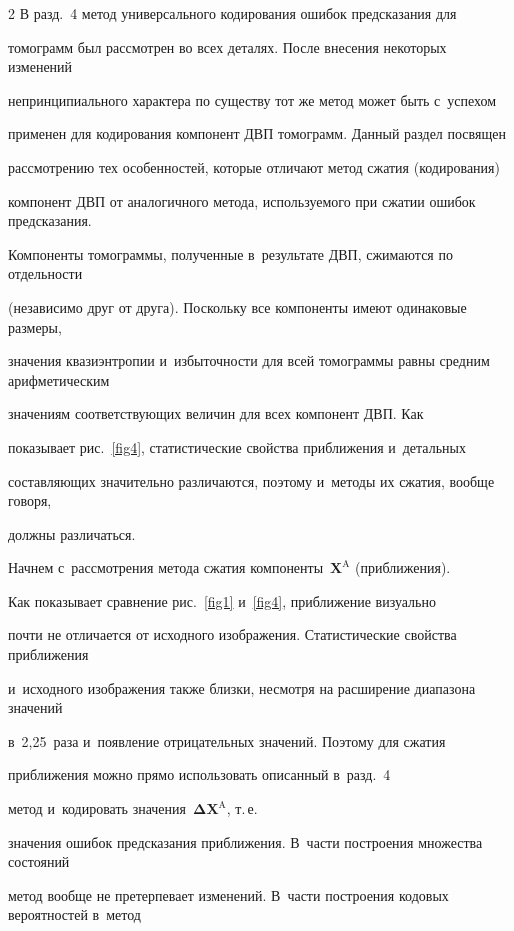 \begin{multicols}{2}
В разд.~4 метод универсального кодирования ошибок предсказания для 

томограмм был рас\-смот\-рен во всех деталях. После внесения некоторых изменений 

непринципиального характера по существу тот же метод может быть с~успехом 

применен для кодирования компонент ДВП томограмм. Данный раздел посвящен 

рассмотрению тех особенностей, которые отличают метод сжатия (кодирования) 

компонент ДВП от аналогичного метода, используемого при сжатии ошибок предсказания.



Компоненты томограммы, полученные в~результате ДВП, сжимаются по отдельности 

(независимо друг от друга). Поскольку все компоненты имеют одинаковые размеры, 

значения квазиэнтропии и~избыточности для всей томограммы равны средним арифметическим 

значениям соответствующих величин для всех компонент ДВП. Как 

показывает рис.~\ref{fig4}, статистические свойства приближения и~детальных 

составляющих значительно различаются, поэтому и~методы их сжатия, вообще говоря, 

должны различаться.



Начнем с~рассмотрения метода сжатия компоненты~$\mathbf{X}^{\mathrm{A}}$ (приближения). 

Как показывает сравнение рис.~\ref{fig1} и~\ref{fig4}, приближение визуально 

почти не отличается от исходного изоб\-ра\-же\-ния. Стати\-стические свойства приближения 

и~исходного изоб\-ра\-же\-ния также близки, несмотря на расширение диапазона значений 

в~2,25~раза и~появление отрицательных значений. Поэтому для сжатия 

приближения можно прямо использовать описанный в~разд.~4 

метод и~кодировать значения~$\boldsymbol{\Delta}\mathbf{X}^{\mathrm{A}}$, т.\,е.\

значения ошибок предсказания приближения. В~час\-ти построения множества состояний 

метод вообще не претерпевает изменений. В~час\-ти по\-стро\-ения кодовых вероятностей в~метод 


\end{multicols}
